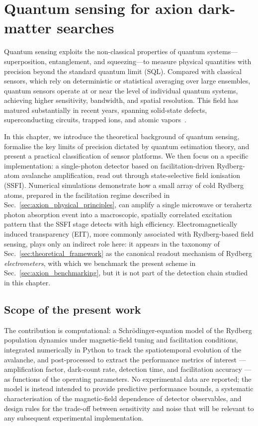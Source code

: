 \section{Quantum sensing for axion dark-matter searches}
Quantum sensing exploits the non-classical properties of quantum systems---superposition, entanglement, and squeezing---to measure physical quantities with precision beyond the standard quantum limit (SQL). Compared with classical sensors, which rely on deterministic or statistical averaging over large ensembles, quantum sensors operate at or near the level of individual quantum systems, achieving higher sensitivity, bandwidth, and spatial resolution. This field has matured substantially in recent years, spanning solid-state defects, superconducting circuits, trapped ions, and atomic vapors~\cite{Degen2017, Ezratty2024}.

In this chapter, we introduce the theoretical background of quantum sensing, formalise the key limits of precision dictated by quantum estimation theory, and present a practical classification of sensor platforms. We then focus on a specific implementation: a single-photon detector based on facilitation-driven Rydberg-atom avalanche amplification, read out through state-selective field ionisation (SSFI). Numerical simulations demonstrate how a small array of cold Rydberg atoms, prepared in the facilitation regime described in Sec.~\ref{sec:axion_physical_principles}, can amplify a single microwave or terahertz photon absorption event into a macroscopic, spatially correlated excitation pattern that the SSFI stage detects with high efficiency. Electromagnetically induced transparency (EIT), more commonly associated with Rydberg-based field sensing, plays only an indirect role here: it appears in the taxonomy of Sec.~\ref{sec:theoretical_framework} as the canonical readout mechanism of Rydberg \emph{electrometers}, with which we benchmark the present scheme in Sec.~\ref{sec:axion_benchmarking}, but it is not part of the detection chain studied in this chapter.

\subsection*{Scope of the present work}

The contribution is computational: a Schrödinger-equation model of the Rydberg population dynamics under magnetic-field tuning and facilitation conditions, integrated numerically in Python to track the spatiotemporal evolution of the avalanche, and post-processed to extract the performance metrics of interest --- amplification factor, dark-count rate, detection time, and facilitation accuracy --- as functions of the operating parameters. No experimental data are reported; the model is instead intended to provide predictive performance bounds, a systematic characterisation of the magnetic-field dependence of detector observables, and design rules for the trade-off between sensitivity and noise that will be relevant to any subsequent experimental implementation.

